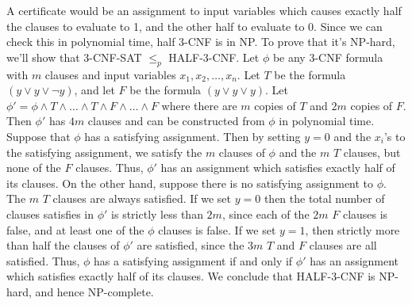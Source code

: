 \documentclass{article}
\begin{document}
A certificate would be an assignment to input variables which causes exactly half the clauses to evaluate to 1, and the other half to evaluate to 0.  Since we can check this in polynomial time, half 3-CNF is in NP.  To prove that it's NP-hard, we'll show that 3-CNF-SAT $\leq_p$  HALF-3-CNF.  Let $\phi$ be any 3-CNF formula with $m$ clauses and input variables $x_1, x_2, \ldots, x_n$.  Let $T$ be the formula $(y \vee y \vee \neg y)$, and let $F$ be the formula $(y \vee y \vee y)$. Let $\phi' = \phi \wedge T \wedge \ldots \wedge T \wedge F \wedge \ldots \wedge F$ where there are $m$ copies of $T$ and $2m$ copies of $F$.  Then $\phi'$ has $4m$ clauses and can be constructed from $\phi$ in polynomial time. Suppose that $\phi$ has a satisfying assignment.  Then by setting $y = 0$ and the $x_i$'s to the satisfying assignment, we satisfy the $m$ clauses of $\phi$ and the $m$ $T$ clauses, but none of the $F$ clauses.  Thus, $\phi'$ has an assignment which satisfies exactly half of its clauses.  On the other hand, suppose there is no satisfying assignment to $\phi$.  The $m$ $T$ clauses are always satisfied.  If we set $y = 0$ then the total number of clauses satisfies in $\phi'$ is strictly less than $2m$, since each of the $2m$ $F$ clauses is false, and at least one of the $\phi$ clauses is false.  If we set $y = 1$, then strictly more than half the clauses of $\phi'$ are satisfied, since the $3m$ $T$ and $F$ clauses are all satisfied.  Thus, $\phi$ has a satisfying assignment if and only if $\phi'$ has an assignment which satisfies exactly half of its clauses.  We conclude that HALF-3-CNF is NP-hard, and hence NP-complete. \\
\end{document}
